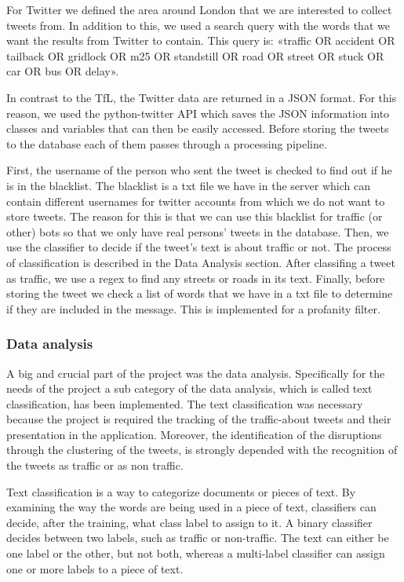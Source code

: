 For Twitter we defined the area around London that we are interested to collect tweets from. In addition to this, we used a search query with the words that we want the results from Twitter to contain. This query is:  «traffic OR accident OR tailback OR gridlock OR m25 OR standstill OR road OR street OR stuck OR car OR bus OR delay».

In contrast to the TfL, the Twitter data are returned in a JSON format. For this reason, we used the python-twitter API which saves the JSON information into classes and variables that can then be easily accessed. Before storing the tweets to the database each of them passes through a processing pipeline.

First, the username of the person who sent the tweet is checked to find out if he is in the blacklist. The blacklist is a txt file we have in the server which can contain different usernames for twitter accounts from which we do not want to store tweets. The reason for this is that we can use this blacklist for traffic (or other) bots so that we only have real persons' tweets in the database. Then, we use the classifier to decide if the tweet's text is about traffic or not. The process of classification is described in the Data Analysis section. After classifing a tweet as traffic, we use a regex to find any streets or roads in its text. Finally, before storing the tweet we check a list of words that we have in a txt file to determine if they are included in the message. This is implemented for a profanity filter.

\subsubsection{Data analysis}
A big and crucial part of the project was the data analysis. Specifically for the needs of the project a sub category of the data analysis, which is called text classification, has been implemented. The text classification was necessary because the project is required the tracking of the traffic-about tweets and their presentation in the application. Moreover, the identification of the disruptions through the clustering of the tweets, is strongly depended with the recognition of the tweets as traffic or as non traffic. 

Text classification is a way to categorize documents or pieces of text. By examining the way the words are being used in a piece of text, classifiers can decide, after the training, what class label to assign to it. A binary classifier decides between two labels, such as traffic or non-traffic. The text can either be one label or the other, but not both, whereas a multi-label classifier can assign one or more labels to a piece of text. 

